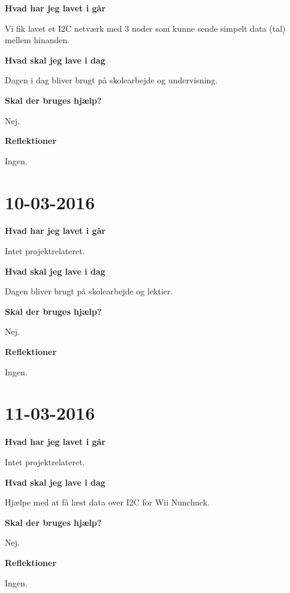 \documentclass{article}
\begin{document}
	\textbf{Hvad har jeg lavet i går}
	
	Vi fik lavet et I2C netværk med 3 noder som kunne sende simpelt data (tal) mellem hinanden.
	
	\textbf{Hvad skal jeg lave i dag}
	
	Dagen i dag bliver brugt på skolearbejde og undervisning.
	
	\textbf{Skal der bruges hjælp?}
	
	Nej.
	
	\textbf{Reflektioner}
	
	Ingen.

	\section{10-03-2016}
	
	\textbf{Hvad har jeg lavet i går}
	
	Intet projektrelateret.
	
	\textbf{Hvad skal jeg lave i dag}
	
	Dagen bliver brugt på skolearbejde og lektier.
	
	\textbf{Skal der bruges hjælp?}
	
	Nej.
	
	\textbf{Reflektioner}
	
	Ingen.

	\section{11-03-2016}
	
	\textbf{Hvad har jeg lavet i går}
	
	Intet projektrelateret.
	
	\textbf{Hvad skal jeg lave i dag}
	
	Hjælpe med at få læst data over I2C for Wii Nunchuck.
	
	\textbf{Skal der bruges hjælp?}
	
	Nej.
	
	\textbf{Reflektioner}
	
	Ingen.
\end{document}
